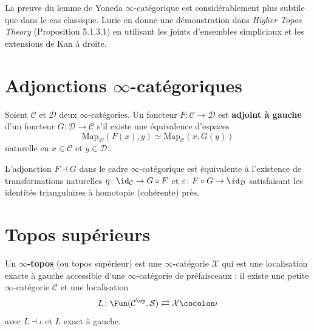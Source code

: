 \begin{remarque}\label{rem:yoneda-infty-subtil}
La preuve du lemme de Yoneda $\infty$-catégorique est considérablement
plus subtile que dans le cas classique.
Lurie en donne une démonstration dans \emph{Higher Topos Theory}
(Proposition 5.1.3.1) en utilisant les joints d'ensembles
simpliciaux et les extensions de Kan à droite.
\end{remarque}

\section{Adjonctions $\infty$-catégoriques}\label{sec:adjonctions-infty}

\begin{definition}
\label{def:adjonction-infty}
Soient $\mathcal{C}$ et $\mathcal{D}$ deux $\infty$-catégories.
Un foncteur $F \colon \mathcal{C} \to \mathcal{D}$ est
\textbf{adjoint à gauche} d'un foncteur
$G \colon \mathcal{D} \to \mathcal{C}$ s'il existe une
équivalence d'espaces
\[
  \mathrm{Map}_\mathcal{D}(F(x), y)
  \simeq
  \mathrm{Map}_\mathcal{C}(x, G(y))
\]
naturelle en $x \in \mathcal{C}$ et $y \in \mathcal{D}$.
\end{definition}

\begin{proposition}
\label{prop:adjonction-infty-unite}
L'adjonction $F \dashv G$ dans le cadre $\infty$-catégorique est
équivalente à l'existence de transformations naturelles
$\eta \colon \id_\mathcal{C} \to G \circ F$ et
$\varepsilon \colon F \circ G \to \id_\mathcal{D}$
satisfaisant les identités triangulaires à homotopie (cohérente) près.
\end{proposition}

\section{Topos supérieurs}\label{sec:topos-superieurs}


\begin{definition}
\label{def:topos-superieur}
Un \textbf{$\infty$-topos} (ou topos supérieur) est une
$\infty$-catégorie $\mathcal{X}$ qui est une localisation exacte
à gauche accessible d'une $\infty$-catégorie de préfaisceaux :
il existe une petite $\infty$-catégorie $\mathcal{C}$ et une
localisation
\[
  L \colon \Fun(\mathcal{C}^\op, \mathcal{S})
  \rightleftarrows \mathcal{X} \cocolon \iota
\]
avec $L \dashv \iota$ et $L$ exact à gauche.
\end{definition}

